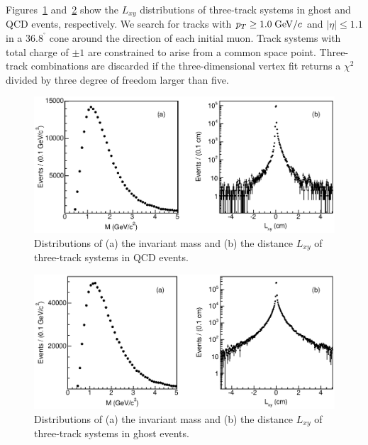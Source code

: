 \documentclass[aps,prd,preprint,floatfix,nofootinbib,superscriptaddress,showpacs,amssymb]{revtex4}
\def\deg{^\circ}
\begin{document}
 Figures~\ref{fig:fig_34} and~\ref{fig:fig_35} show the $L_{xy}$
 distributions of three-track systems in ghost and QCD events,
 respectively. We search for tracks with $p_T \geq 1.0 \; {\rm GeV/}c$ and
 $|\eta| \leq 1.1$ in a $36.8^{\deg}$ cone around the direction of 
 each initial muon. Track systems with total charge of $\pm 1$ are 
 constrained to arise from a common space point. Three-track combinations 
 are discarded if the three-dimensional vertex fit returns a $\chi^2$
 divided by three degree of freedom larger than five.
 \begin{figure}
 \begin{center}
 \vspace{-0.3in}
 \leavevmode
 \includegraphics*[width=\textwidth]{fa0_34.eps}
 \caption[]{Distributions of  (a) the invariant mass and (b) the distance
            $L_{xy}$ of three-track systems in QCD events. } 
 \label{fig:fig_34}
 \end{center}
 \end{figure}
 \begin{figure}
 \begin{center}
 \vspace{-0.3in}
 \leavevmode
 \includegraphics*[width=\textwidth]{fa0_35.eps}
 \caption[]{Distributions of (a) the  invariant mass and (b) the distance 
            $L_{xy}$ of three-track systems in ghost events. } 
 \label{fig:fig_35}
 \end{center}
 \end{figure}
\end{document}
